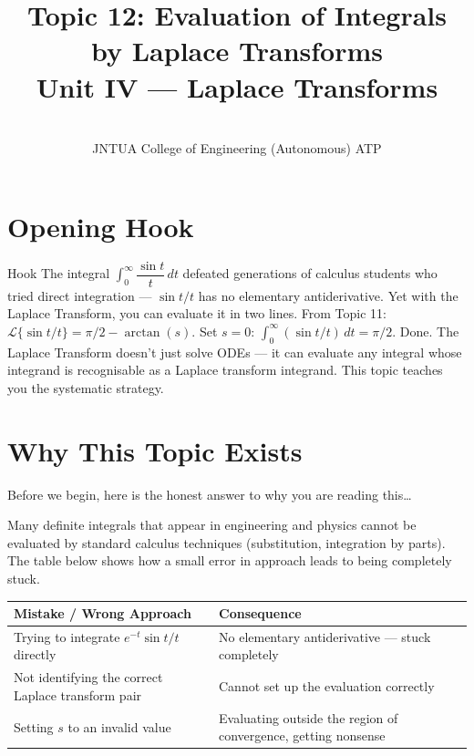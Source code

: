 \documentclass[12pt,a4paper]{article}
\title{Topic 12: Evaluation of Integrals by Laplace Transforms \\
       \large Unit IV --- Laplace Transforms}
\author{ \\
        JNTUA College of Engineering (Autonomous) ATP}
\date{}
\begin{document}
\maketitle
\tableofcontents
\newpage

\section{Opening Hook}

\begin{curiositybox}{Hook}
The integral $\int_0^\infty \dfrac{\sin t}{t}\, dt$ defeated generations of
calculus students who tried direct integration --- $\sin t/t$ has no elementary
antiderivative. Yet with the Laplace Transform, you can evaluate it in two
lines. From Topic 11: $\mathcal{L}\{\sin t / t\} = \pi/2 - \arctan(s)$. Set
$s = 0$: $\int_0^\infty (\sin t/t)\, dt = \pi/2$. Done. The Laplace Transform
doesn't just solve ODEs --- it can evaluate any integral whose integrand is
recognisable as a Laplace transform integrand. This topic teaches you the
systematic strategy.
\end{curiositybox}

\section{Why This Topic Exists}

Before we begin, here is the honest answer to why you are reading this\ldots

Many definite integrals that appear in engineering and physics cannot be
evaluated by standard calculus techniques (substitution, integration by parts).
The table below shows how a small error in approach leads to being completely
stuck.

\begin{center}
\begin{tabular}{@{}p{7cm}p{7cm}@{}}
\toprule
\textbf{Mistake / Wrong Approach} & \textbf{Consequence} \\
\midrule
Trying to integrate $e^{-t}\sin t / t$ directly
  & No elementary antiderivative --- stuck completely \\
\midrule
Not identifying the correct Laplace transform pair
  & Cannot set up the evaluation correctly \\
\midrule
Setting $s$ to an invalid value
  & Evaluating outside the region of convergence, getting nonsense \\
\bottomrule
\end{tabular}
\end{center}
\end{document}
